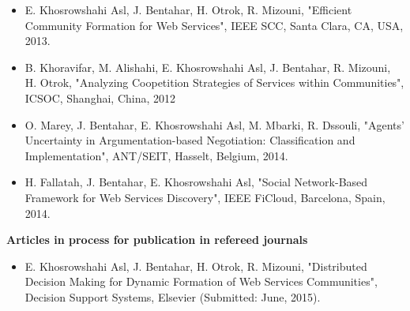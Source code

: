 \begin{itemize}
\item E. Khosrowshahi Asl, J. Bentahar, H. Otrok, R. Mizouni, "Efficient Community Formation for Web Services", IEEE SCC, Santa Clara, CA, USA, 2013.

\item B. Khoravifar, M. Alishahi, E. Khosrowshahi Asl, J. Bentahar, R. Mizouni, H. Otrok, "Analyzing Coopetition Strategies of Services within Communities", ICSOC, Shanghai, China, 2012

\item O. Marey, J. Bentahar, E. Khosrowshahi Asl, M. Mbarki, R. Dssouli, "Agents' Uncertainty in Argumentation-based Negotiation: Classification and Implementation", ANT/SEIT, Hasselt, Belgium, 2014.

\item H. Fallatah, J. Bentahar, E. Khosrowshahi Asl, "Social Network-Based Framework for Web Services Discovery", IEEE  FiCloud, Barcelona, Spain, 2014.


\end{itemize}

\textbf{Articles in process for publication in refereed journals}

\begin{itemize}
\item E. Khosrowshahi Asl, J. Bentahar, H. Otrok, R. Mizouni, "Distributed Decision Making for Dynamic Formation of Web Services Communities", Decision Support Systems, Elsevier (Submitted: June, 2015).
\end{itemize}

